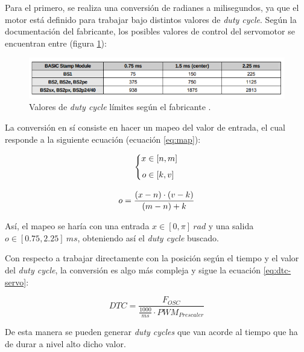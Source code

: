 Para el primero, se realiza una conversión de radianes a milisegundos, ya que el motor
está definido para trabajar bajo distintos valores de \textit{duty cycle}. Según la
documentación del fabricante, los posibles valores de control del servomotor se
encuentran entre (figura \ref{fig:servo_dtc}):

\begin{figure}[H]
    \centering
    \includegraphics[width=.7\linewidth]{pictures/servo_duty_cycle.png}
    \caption{Valores de \textit{duty cycle} límites según el fabricante \cite{90000005ServomotorParallax}.}
    \label{fig:servo_dtc}
\end{figure}

La conversión en sí consiste en hacer un mapeo del valor de entrada, el cual responde
a la siguiente ecuación (ecuación \ref{eq:map}):

\begin{gather}
    \left\{\begin{aligned}
        x & \in \left[n, m\right] \\[1ex]
        o & \in \left[k, v\right]    
    \end{aligned}\right. \notag \\[2ex]
    o = \frac{\left(x - n\right) \cdot \left(v - k\right)}{\left(m - n\right) + k} \\ \label{eq:map}
\end{gather}

Así, el mapeo se haría con una entrada $x \in \left[0, \pi\right]~rad$ y una salida 
$o \in \left[0.75, 2.25\right]~ms$, obteniendo así el \textit{duty cycle} buscado.

Con respecto a trabajar directamente con la posición según el tiempo y el valor del
\textit{duty cycle}, la conversión es algo más compleja y sigue la ecuación \ref{eq:dtc-servo}:

\begin{equation}\label{eq:dtc-servo}
    DTC = \frac{F_{OSC}}{\frac{1000}{ms} \cdot PWM_{Prescaler}}
\end{equation}

De esta manera se pueden generar \textit{duty cycles} que van acorde al tiempo que
ha de durar a nivel alto dicho valor.